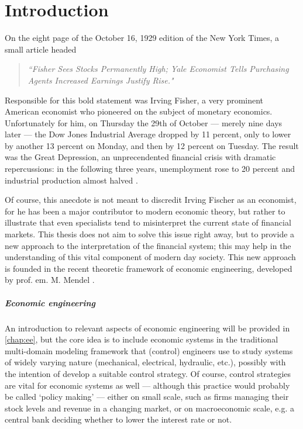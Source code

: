 \chapter{Introduction}
\label{chap:intro}
On the eight page of the October 16, 1929 edition of the New York Times, a small article headed \cite{NYT1929}
\begin{quote}
    \emph{``Fisher Sees Stocks Permanently High; Yale Economist Tells Purchasing Agents Increased Earnings Justify Rise."} 
\end{quote}
Responsible for this bold statement was Irving Fisher, a very prominent American economist who pioneered on the subject of monetary economics. Unfortunately for him, on Thursday the 29th of October --- merely nine days later --- the Dow Jones Industrial Average dropped by 11 percent, only to lower by another 13 percent on Monday, and then by 12 percent on Tuesday. The result was the Great Depression, an unprecendented financial crisis with dramatic repercussions: in the following three years, unemployment rose to 20 percent and industrial production almost halved \cite{gdepression}. 

Of course, this anecdote is not meant to discredit Irving Fischer as an economist, for he has been a major contributor to modern economic theory, but rather to illustrate that even specialists tend to misinterpret the current state of financial markets. This thesis does not aim to solve this issue right away, but to provide a new approach to the interpretation of the financial system; this may help in the understanding of this vital component of modern day society. This new approach is founded in the recent theoretic framework of economic engineering, developed by prof. em. M. Mendel \cite{Mendel2019}. 

\paragraph{Economic engineering} An introduction to relevant aspects of economic engineering will be provided in \cref{chap:ee}, but the core idea is to include economic systems in the traditional multi-domain modeling framework that (control) engineers use to study systems of widely varying nature (mechanical, electrical, hydraulic, etc.), possibly with the intention of develop a suitable control strategy. Of course, control strategies are vital for economic systems as well --- although this practice would probably be called `policy making' --- either on small scale, such as firms managing their stock levels and revenue in a changing market, or on macroeconomic scale, e.g. a central bank deciding whether to lower the interest rate or not.

